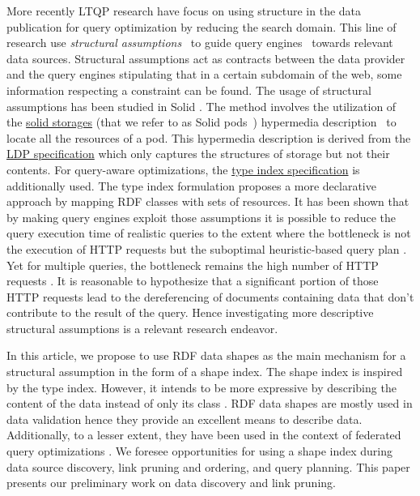 More recently LTQP research have focus on using structure in the data publication for query optimization by reducing the search domain.
This line of research use \emph{structural assumptions}~\cite{Taelman2023} to guide query engines~\cite{verborgh2020guided} towards relevant data sources.
Structural assumptions act as contracts between the data provider and the query engines stipulating that in a certain subdomain of the web, some information respecting a constraint can be found.
The usage of structural assumptions has been studied in Solid \cite{Taelman2023}.
The method involves the utilization of the 
\href{https://solidproject.org/TR/protocol#resources}{solid storages} (that we refer to as Solid pods~\cite{Taelman2023}) hypermedia description~\cite{Fielding}
to locate all the resources of a pod. 
This hypermedia description is derived from the \href{https://www.w3.org/TR/ldp/}{LDP specification}
which only captures the structures of storage but not their contents.
For query-aware optimizations, the \href{https://solid.github.io/type-indexes/}{type index specification} is additionally used.
The type index formulation proposes a more declarative approach \cite{Taelman2017} by mapping RDF classes with sets of resources.
It has been shown that by making query engines exploit those assumptions it is possible to reduce the query execution time
of realistic queries to the extent where the bottleneck is not the execution of 
HTTP requests but the suboptimal heuristic-based query plan \cite{eschauzier_quweda_2023, Taelman2023}.
Yet for multiple queries, the bottleneck remains the high number of HTTP requests  \cite{eschauzier_quweda_2023}.
It is reasonable to hypothesize that a significant portion of those HTTP requests lead to the dereferencing of
documents containing data that don't contribute to the result of the query.
Hence investigating more descriptive structural assumptions is a relevant research endeavor.

In this article, we propose to use RDF data shapes as the main mechanism for a structural assumption in the form of a shape index.
The shape index is inspired by the type index.
However, it intends to be more expressive by describing the content of the data instead of only its class \cite{Taelman2017}.
RDF data shapes are mostly used in data validation \cite{Gayo2018a} hence they provide an excellent means to describe data.
Additionally, to a lesser extent, they have been used in the context of federated query optimizations \cite{kashif2021}.
We foresee opportunities for using a shape index during data source discovery, link pruning and ordering, and query planning.
This paper presents our preliminary work on data discovery and link pruning.
